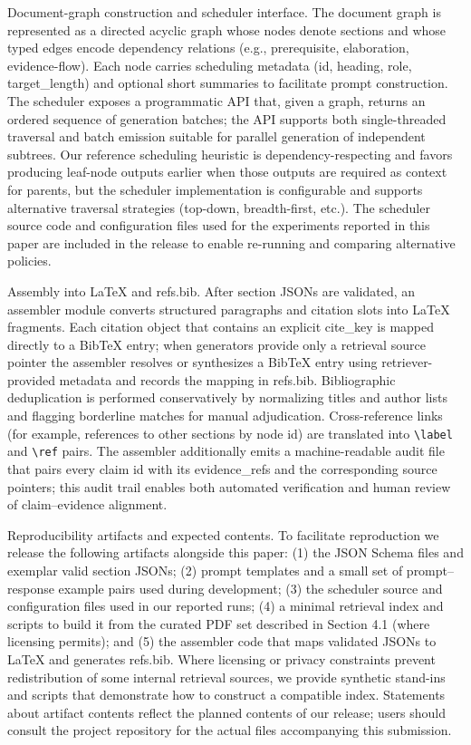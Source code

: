 \documentclass{article}%
\begin{document}
Document-graph construction and scheduler interface.
The document graph is represented as a directed acyclic graph whose nodes denote sections and whose typed edges encode dependency relations (e.g., prerequisite, elaboration, evidence-flow). Each node carries scheduling metadata (id, heading, role, target_length) and optional short summaries to facilitate prompt construction. The scheduler exposes a programmatic API that, given a graph, returns an ordered sequence of generation batches; the API supports both single-threaded traversal and batch emission suitable for parallel generation of independent subtrees. Our reference scheduling heuristic is dependency-respecting and favors producing leaf-node outputs earlier when those outputs are required as context for parents, but the scheduler implementation is configurable and supports alternative traversal strategies (top-down, breadth-first, etc.). The scheduler source code and configuration files used for the experiments reported in this paper are included in the release to enable re-running and comparing alternative policies.

Assembly into LaTeX and refs.bib.
After section JSONs are validated, an assembler module converts structured paragraphs and citation slots into LaTeX fragments. Each citation object that contains an explicit cite_key is mapped directly to a BibTeX entry; when generators provide only a retrieval source pointer the assembler resolves or synthesizes a BibTeX entry using retriever-provided metadata and records the mapping in refs.bib. Bibliographic deduplication is performed conservatively by normalizing titles and author lists and flagging borderline matches for manual adjudication. Cross-reference links (for example, references to other sections by node id) are translated into \verb|\label| and \verb|\ref| pairs. The assembler additionally emits a machine-readable audit file that pairs every claim id with its evidence_refs and the corresponding source pointers; this audit trail enables both automated verification and human review of claim–evidence alignment.

Reproducibility artifacts and expected contents.
To facilitate reproduction we release the following artifacts alongside this paper: (1) the JSON Schema files and exemplar valid section JSONs; (2) prompt templates and a small set of prompt–response example pairs used during development; (3) the scheduler source and configuration files used in our reported runs; (4) a minimal retrieval index and scripts to build it from the curated PDF set described in Section 4.1 (where licensing permits); and (5) the assembler code that maps validated JSONs to LaTeX and generates refs.bib. Where licensing or privacy constraints prevent redistribution of some internal retrieval sources, we provide synthetic stand-ins and scripts that demonstrate how to construct a compatible index. Statements about artifact contents reflect the planned contents of our release; users should consult the project repository for the actual files accompanying this submission.
\end{document}
